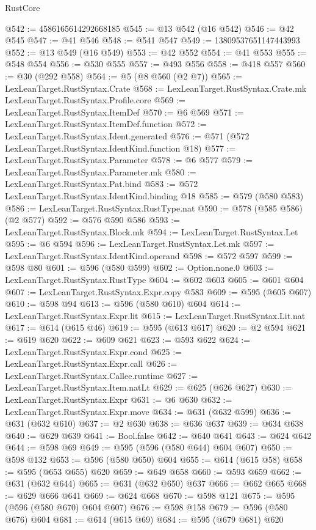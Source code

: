 \begin{lexlean}{RustCore}
\begin{coremodule}
@542 := 4586165614292668185
@545 := @13 @542 (@16 @542)
@546 := @42 @545
@547 := @41 @546
@548 := @541 @547
@549 := 13809537651147443993
@552 := @13 @549 (@16 @549)
@553 := @42 @552
@554 := @41 @553
@555 := @548 @554
@556 := @530 @555
@557 := @493 @556
@558 := @418 @557
@560 := @30 (@292 @558)
@564 := @5 (@8 @560 (@2 @7))
@565 := LexLeanTarget.RustSyntax.Crate
@568 := LexLeanTarget.RustSyntax.Crate.mk LexLeanTarget.RustSyntax.Profile.core
@569 := LexLeanTarget.RustSyntax.ItemDef
@570 := @6 @569
@571 := LexLeanTarget.RustSyntax.ItemDef.function
@572 := LexLeanTarget.RustSyntax.Ident.generated
@576 := @571 (@572 LexLeanTarget.RustSyntax.IdentKind.function @18)
@577 := LexLeanTarget.RustSyntax.Parameter
@578 := @6 @577
@579 := LexLeanTarget.RustSyntax.Parameter.mk
@580 := LexLeanTarget.RustSyntax.Pat.bind
@583 := @572 LexLeanTarget.RustSyntax.IdentKind.binding @18
@585 := @579 (@580 @583)
@586 := LexLeanTarget.RustSyntax.RustType.nat
@590 := @578 (@585 @586) (@2 @577)
@592 := @576 @590 @586
@593 := LexLeanTarget.RustSyntax.Block.mk
@594 := LexLeanTarget.RustSyntax.Let
@595 := @6 @594
@596 := LexLeanTarget.RustSyntax.Let.mk
@597 := LexLeanTarget.RustSyntax.IdentKind.operand
@598 := @572 @597
@599 := @598 @80
@601 := @596 (@580 @599)
@602 := Option.none.{0}
@603 := LexLeanTarget.RustSyntax.RustType
@604 := @602 @603
@605 := @601 @604
@607 := LexLeanTarget.RustSyntax.Expr.copy @583
@609 := @595 (@605 @607)
@610 := @598 @94
@613 := @596 (@580 @610) @604
@614 := LexLeanTarget.RustSyntax.Expr.lit
@615 := LexLeanTarget.RustSyntax.Lit.nat
@617 := @614 (@615 @46)
@619 := @595 (@613 @617)
@620 := @2 @594
@621 := @619 @620
@622 := @609 @621
@623 := @593 @622
@624 := LexLeanTarget.RustSyntax.Expr.cond
@625 := LexLeanTarget.RustSyntax.Expr.call
@626 := LexLeanTarget.RustSyntax.Callee.runtime
@627 := LexLeanTarget.RustSyntax.Item.natLt
@629 := @625 (@626 @627)
@630 := LexLeanTarget.RustSyntax.Expr
@631 := @6 @630
@632 := LexLeanTarget.RustSyntax.Expr.move
@634 := @631 (@632 @599)
@636 := @631 (@632 @610)
@637 := @2 @630
@638 := @636 @637
@639 := @634 @638
@640 := @629 @639
@641 := Bool.false
@642 := @640 @641
@643 := @624 @642
@644 := @598 @69
@649 := @595 (@596 (@580 @644) @604 @607)
@650 := @598 @132
@653 := @596 (@580 @650) @604
@655 := @614 (@615 @58)
@658 := @595 (@653 @655) @620
@659 := @649 @658
@660 := @593 @659
@662 := @631 (@632 @644)
@665 := @631 (@632 @650) @637
@666 := @662 @665
@668 := @629 @666 @641
@669 := @624 @668
@670 := @598 @121
@675 := @595 (@596 (@580 @670) @604 @607)
@676 := @598 @158
@679 := @596 (@580 @676) @604
@681 := @614 (@615 @69)
@684 := @595 (@679 @681) @620

\end{coremodule}
\end{lexlean}
